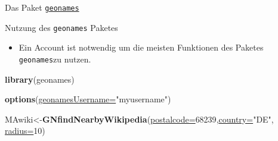 \documentclass[ignorenonframetext,]{beamer}
\newenvironment{Shaded}{\begin{snugshade}}{\end{snugshade}}
\newcommand{\DataTypeTok}[1]{\textcolor[rgb]{0.74,0.68,0.62}{\underline{#1}}}
\newcommand{\DecValTok}[1]{\textcolor[rgb]{0.27,0.67,0.26}{#1}}
\newcommand{\KeywordTok}[1]{\textcolor[rgb]{0.26,0.66,0.93}{\textbf{#1}}}
\newcommand{\NormalTok}[1]{\textcolor[rgb]{0.74,0.68,0.62}{#1}}
\newcommand{\StringTok}[1]{\textcolor[rgb]{0.02,0.61,0.04}{#1}}
\providecommand{\tightlist}{%
  \setlength{\itemsep}{0pt}\setlength{\parskip}{0pt}}
\begin{document}
\begin{frame}[fragile]{Das Paket
\href{https://github.com/ropensci/geonames}{\texttt{geonames}}}
\protect\hypertarget{das-paket-geonames}{}

\begin{block}{Nutzung des \texttt{geonames} Paketes}

\begin{itemize}
\tightlist
\item
  Ein Account ist notwendig um die meisten Funktionen des Paketes
  \texttt{geonames}zu nutzen.
\end{itemize}

\begin{Shaded}
\begin{Highlighting}[]
\KeywordTok{library}\NormalTok{(geonames)}
\end{Highlighting}
\end{Shaded}

\begin{Shaded}
\begin{Highlighting}[]
\KeywordTok{options}\NormalTok{(}\DataTypeTok{geonamesUsername=}\StringTok{"myusername"}\NormalTok{)}
\end{Highlighting}
\end{Shaded}

\begin{Shaded}
\begin{Highlighting}[]
\NormalTok{MAwiki<-}\KeywordTok{GNfindNearbyWikipedia}\NormalTok{(}\DataTypeTok{postalcode=}\DecValTok{68239}\NormalTok{,}\DataTypeTok{country=}\StringTok{"DE"}\NormalTok{,}
                              \DataTypeTok{radius=}\DecValTok{10}\NormalTok{)}
\end{Highlighting}
\end{Shaded}

\end{block}

\end{frame}
\end{document}
